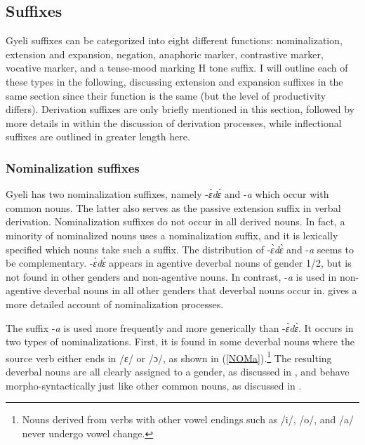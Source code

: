 \subsection{Suffixes}
\label{sec:Suffix}

Gyeli  suffixes can be categorized into eight different functions: nominalization, extension and expansion, negation, anaphoric marker, contrastive marker, vocative marker, and a tense-mood marking H tone suffix. I will outline each of these types in the following, discussing extension and expansion suffixes in the same section since their function is the same (but the level of productivity differs).
Derivation suffixes are only briefly mentioned in this section, followed by more details in  within the discussion of derivation processes, while inflectional suffixes are outlined in greater length here.


\subsubsection{Nominalization suffixes}
\label{sec:NOMSuff}

Gyeli has two nominalization suffixes, namely -{\itshape ɛ̀dɛ̀} and -{\itshape a} which occur with common nouns. The latter also serves as the passive extension suffix in verbal derivation. Nominalization suffixes do not occur in all derived nouns. In fact, a minority of nominalized nouns uses a nominalization suffix, and it is lexically specified which nouns take such a suffix. The distribution of -{\itshape ɛ̀dɛ̀} and -{\itshape a} seems to be complementary. -{\itshape ɛ̀dɛ̀} appears in agentive deverbal nouns of gender 1/2, but is not found in other genders and non-agentive nouns. In contrast, -{\itshape a} is used in non-agentive deverbal nouns in all other genders that deverbal nouns occur in.  gives a more detailed account of nominalization processes.

The suffix -{\itshape a} is used more frequently and more generically than -{\itshape ɛ̀dɛ̀}. It occurs in two types of nominalizations. First, it is found in some deverbal nouns where the source verb either ends in /ɛ/ or /ɔ/, as shown in (\ref{NOMa}).\footnote{Nouns derived from verbs with other vowel endings such as /i/, /o/, and /a/ never undergo vowel change.} The resulting deverbal nouns are all clearly assigned to a gender, as discussed in , and behave morpho-syntactically just like other common nouns, as discussed in .

